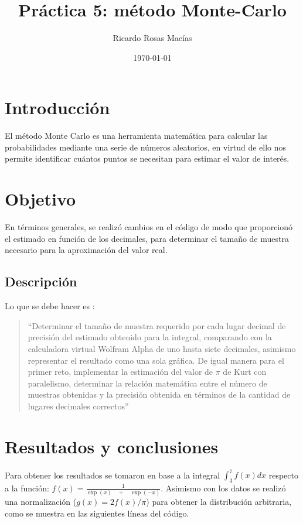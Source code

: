 \documentclass[12pt, letterpaper] {article}
\author{Ricardo Rosas Macías}
\title{Práctica 5: método Monte-Carlo}
\date{\today}
\begin{document}
\maketitle



\section{Introducción}

El método Monte Carlo es una herramienta matemática para calcular las probabilidades mediante una serie de números aleatorios, en virtud de ello nos permite identificar cuántos puntos se necesitan para estimar el valor de interés.

 \section{Objetivo}
En términos generales,  se realizó cambios en el código de modo que proporcionó el estimado en función de los decimales, para determinar el tamaño de muestra necesario para la aproximación del valor real.
 
 \subsection{Descripción}
 
Lo que se debe hacer es \cite{elisaweb}:
\begin{quotation}
 ``Determinar el tamaño de muestra requerido por cada lugar decimal de precisión del estimado obtenido para la integral, comparando con la calculadora virtual Wolfram Alpha \cite{Wol} de uno hasta siete decimales, asimismo representar el resultado como una sola gráfica.
 De igual manera para el primer reto, implementar la estimación del valor de $\pi$ de Kurt \cite{kurt} con paralelismo, determinar la relación matemática entre el número de muestras obtenidas y la precisión obtenida en términos de la cantidad de lugares decimales correctos''
\end{quotation}

\section{Resultados y conclusiones}

Para obtener los resultados se tomaron en base a la integral $\int _{ 3 }^{ 7 }{ f(x)dx }$ respecto a la función: $f\left(x \right)=\frac {1}{ \exp(x)\quad +\quad \exp(-x) }$.  Asimismo con los datos se realizó una normalización ($g(x)=2f(x)/\pi$) para obtener la distribución arbitraria, como se muestra en las siguientes líneas del código.\vspace{2mm}
\end{document}
